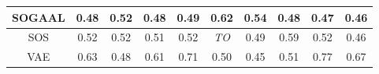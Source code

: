 \begin{table*}[!b]
\begin{tabular}{|c|c|c|c|c|c|c|c|c|c|}
\hline
                        SOGAAL &                   0.48 &                        0.52 &                   0.48 &                         0.49 &                   0.62 &               \textbf{0.54} &                     0.48 &                  0.47 &                   0.46 \\
\hline
                        SOS &                   0.52 &                        0.52 &                   0.51 &                         0.52 &            \textit{TO} &                        0.49 &                     0.59 &                  0.52 &                   0.46 \\
\hline
                        VAE &                   0.63 &                        0.48 &                   0.61 &                         0.71 &                   0.50 &                        0.45 &                     0.51 &                  0.77 &                   0.67 \\
\hline
\end{tabular}
\end{table*}

